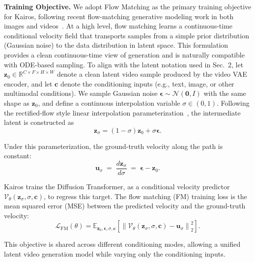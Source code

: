 \textbf{Training Objective.} 
We adopt Flow Matching as the primary training objective for Kairos, following recent flow-matching generative modeling work in both images and videos~\cite{lipman2023flowmatching,rectifiedflow,sd3,hunyuanvideo,opensora2,wan2025}.
At a high level, flow matching learns a continuous-time conditional velocity field that transports samples from a simple prior distribution (Gaussian noise) to the data distribution in latent space.
This formulation provides a clean continuous-time view of generation and is naturally compatible with ODE-based sampling. To align with the latent notation used in Sec.~2, let $\bm{z}_0 \in \mathbb{R}^{C \times F \times H \times W}$ denote a clean latent video sample produced by the video VAE encoder, and let $\bm{c}$ denote the conditioning inputs (e.g., text, image, or other multimodal conditions).
We sample Gaussian noise $\bm{\epsilon} \sim \mathcal{N}(\bm{0}, I)$ with the same shape as $\bm{z}_0$, and define a continuous interpolation variable $\sigma \in (0,1)$.
Following the rectified-flow style linear interpolation parameterization~\cite{rectifiedflow,sd3}, the intermediate latent is constructed as
\begin{equation}
\bm{z}_{\sigma} = (1-\sigma)\bm{z}_0 + \sigma \bm{\epsilon} .
\label{eq:fm_interpolation}
\end{equation}

Under this parameterization, the ground-truth velocity along the path is constant:
\begin{equation}
\bm{u}_{\sigma} \;=\; \frac{d \bm{z}_{\sigma}}{d \sigma} \;=\; \bm{\epsilon} - \bm{z}_0 .
\label{eq:fm_velocity_target}
\end{equation}

Kairos trains the Diffusion Transformer, as a conditional velocity predictor $\mathcal{V}_{\theta}(\bm{z}_{\sigma}, \sigma, \bm{c})$, to regress this target.
The flow matching (FM) training loss is the mean squared error (MSE) between the predicted velocity and the ground-truth velocity:
\begin{equation}
\mathcal{L}_{\mathrm{FM}}(\theta)
=
\mathbb{E}_{\bm{z}_0,\bm{\epsilon},\sigma,\bm{c}}
\left[
\left\|
\mathcal{V}_{\theta}(\bm{z}_{\sigma}, \sigma, \bm{c}) - \bm{u}_{\sigma}
\right\|_2^2
\right].
\label{eq:fm_loss}
\end{equation}

This objective is shared across different conditioning modes, allowing a unified latent video generation model while varying only the conditioning inputs.


